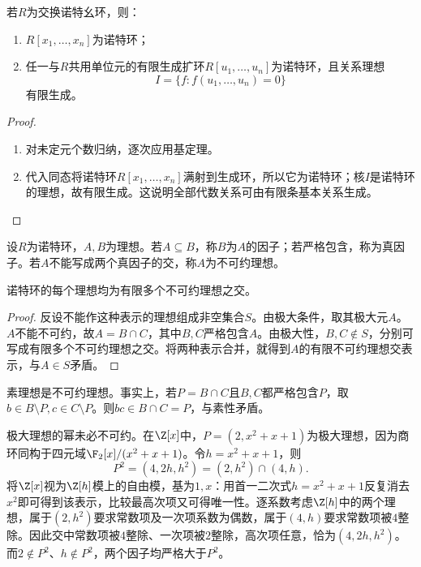 \begin{corollary}
若$R$为交换诺特幺环，则：
\begin{enumerate}
\item $R[x_1,\ldots,x_n]$为诺特环；
\item 任一与$R$共用单位元的有限生成扩环$R[u_1,\ldots,u_n]$为诺特环，且关系理想
\[
I=\{f:f(u_1,\ldots,u_n)=0\}
\]
有限生成。
\end{enumerate}
\end{corollary}
\begin{proof}
\begin{enumerate}
\item 对未定元个数归纳，逐次应用基定理。
\item 代入同态将诺特环$R[x_1,\ldots,x_n]$满射到生成环，所以它为诺特环；核$I$是诺特环的理想，故有限生成。这说明全部代数关系可由有限条基本关系生成。
\end{enumerate}
\end{proof}

\begin{definition}
设$R$为诺特环，$A,B$为理想。若$A\subseteq B$，称$B$为$A$的因子；若严格包含，称为真因子。若$A$不能写成两个真因子的交，称$A$为不可约理想。
\end{definition}

\begin{theorem}\label{p2:noetherian-irreducible-intersection}
诺特环的每个理想均为有限多个不可约理想之交。
\end{theorem}
\begin{proof}
反设不能作这种表示的理想组成非空集合$S$。由极大条件，取其极大元$A$。$A$不能不可约，故$A=B\cap C$，其中$B,C$严格包含$A$。由极大性，$B,C\notin S$，分别可写成有限多个不可约理想之交。将两种表示合并，就得到$A$的有限不可约理想交表示，与$A\in S$矛盾。
\end{proof}

\begin{example}
素理想是不可约理想。事实上，若$P=B\cap C$且$B,C$都严格包含$P$，取$b\in B\setminus P,c\in C\setminus P$。则$bc\in B\cap C=P$，与素性矛盾。

极大理想的幂未必不可约。在$\Z[x]$中，$P=(2,x^2+x+1)$为极大理想，因为商环同构于四元域$\F_2[x]/(x^2+x+1)$。令$h=x^2+x+1$，则
\[
P^2=(4,2h,h^2)=(2,h^2)\cap(4,h).
\]
将$\Z[x]$视为$\Z[h]$模上的自由模，基为$1,x$：用首一二次式$h=x^2+x+1$反复消去$x^2$即可得到该表示，比较最高次项又可得唯一性。逐系数考虑$\Z[h]$中的两个理想，属于$(2,h^2)$要求常数项及一次项系数为偶数，属于$(4,h)$要求常数项被$4$整除。因此交中常数项被$4$整除、一次项被$2$整除，高次项任意，恰为$(4,2h,h^2)$。而$2\notin P^2$、$h\notin P^2$，两个因子均严格大于$P^2$。
\end{example}

